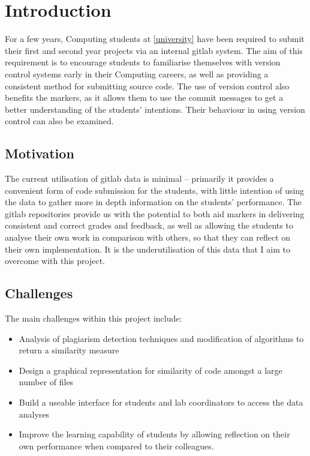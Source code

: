 
\chapter{Introduction} %

\label{Introduction} %


For a few years, Computing students at \ref{university} have been required to
submit their first and second year projects via an internal gitlab system. The
aim of this requirement is to encourage students to familiarise themselves with
version control systems early in their Computing careers, as well as providing
a consistent method for submitting source code. The use of version control also
benefits the markers, as it allows them to use the commit messages to get a better
understanding of the students' intentions. Their behaviour in using version control
can also be examined.

\section{Motivation}

The current utilisation of gitlab data is minimal -- primarily it provides a
convenient form of code submission for the students, with little intention of
using the data to gather more in depth information on the students' performance.
The gitlab repositories provide us with the potential to both aid markers
in delivering consistent and correct grades and feedback, as well as allowing
the students to analyse their own work in comparison with others, so that they
can reflect on their own implementation. It is the underutilisation of this
data that I aim to overcome with this project.

\section{Challenges}

The main challenges within this project include:

\begin{itemize}

\item Analysis of plagiarism detection techniques and modification of algorithms
to return a similarity measure

\item Design a graphical representation for similarity of code amongst a large
number of files

\item Build a useable interface for students and lab coordinators to access the
data analyses

\item Improve the learning capability of students by allowing reflection on their
own performance when compared to their colleagues.

\end{itemize}